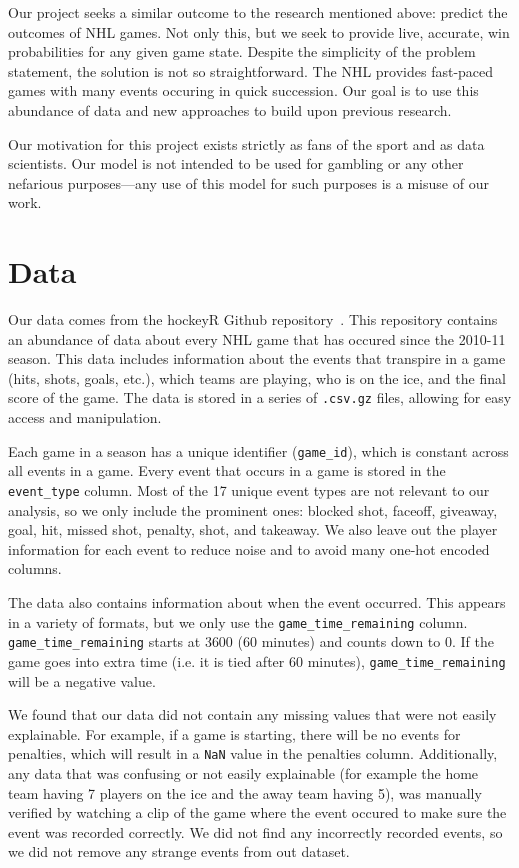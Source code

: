 \documentclass[11pt]{article}
\begin{document}
Our project seeks a similar outcome to the research mentioned above: predict the outcomes of NHL games. Not only this,
but we seek to provide live, accurate, win probabilities for any given game state. Despite the simplicity of the problem statement, 
the solution is not so straightforward. The NHL provides fast-paced games with many events
occuring in quick succession. Our goal is to use this abundance of data and new approaches to build upon previous research.

Our motivation for this project exists strictly as fans of the sport and as data scientists. Our model is not intended to be used for gambling or any other
nefarious purposes—any use of this model for such purposes is a misuse of our work.

\section{Data}
Our data comes from the hockeyR Github repository~\cite{hockeyR-data}. This repository contains an abundance of data about every NHL game
that has occured since the 2010-11 season. This data includes information about the events that transpire in a game (hits, shots, goals, etc.),
which teams are playing, who is on the ice, and the final score of the game. The data is stored in a series of {\tt .csv.gz} files, allowing for
easy access and manipulation.

Each game in a season has a unique identifier ({\tt game\_id}), which is constant across all events in a game. Every event that occurs in a game is stored in the {\tt event\_type} column. Most of the 17 unique event types are not relevant to our analysis, so we only include the prominent ones: blocked shot, faceoff, giveaway, goal, hit, missed shot, penalty, shot, and takeaway. We also leave out the player information for each event to reduce noise and to avoid many one-hot encoded columns.

The data also contains information about when the event occurred. This appears in a variety of formats, but we only
use the {\tt game\_time\_remaining} column. {\tt game\_time\_remaining} starts
at 3600 (60 minutes) and counts down to 0. If the game goes into extra time (i.e. it is tied after 60 minutes), {\tt game\_time\_remaining} will
be a negative value.

We found that our data did not contain any missing values that were not easily explainable. For example, if a game is starting, there will be no
events for penalties, which will result in a {\tt NaN} value in the penalties column. Additionally, any data that was confusing or not easily explainable
(for example the home team having 7 players on the ice and the away team having 5), was manually verified by watching a clip of the game where
the event occured to make sure the event was recorded correctly. We did not find any incorrectly recorded events, so we 
did not remove any strange events from out dataset.
\end{document}
